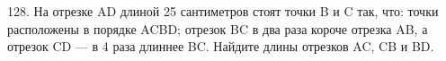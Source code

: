 128. На отрезке AD длиной 25 сантиметров стоят точки B и C так, что: точки расположены в порядке ACBD; отрезок BC в два раза короче отрезка AB, а отрезок CD --- в 4 раза длиннее BC. Найдите длины отрезков AC, CB и BD.\\
